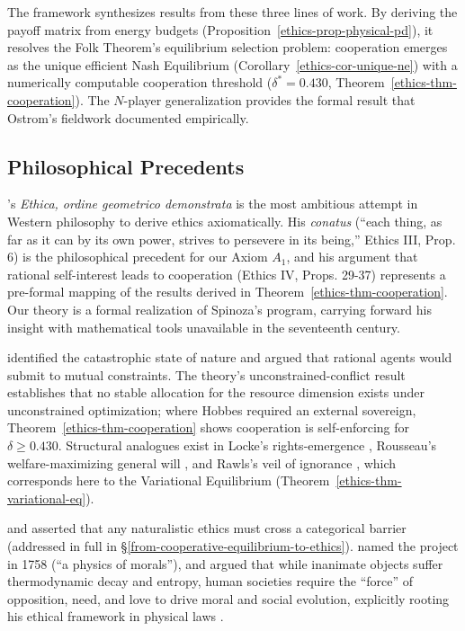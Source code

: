 \documentclass[11pt]{article}
\theoremstyle{plain}
\theoremstyle{definition}
\theoremstyle{remark}
\let\origsubsection\subsection
\renewcommand{\subsection}{\needspace{7\baselineskip}\origsubsection}
\begin{document}
The framework synthesizes results from these three lines of work. By
deriving the payoff matrix from energy budgets
(Proposition~\ref{ethics-prop-physical-pd}), it resolves the Folk
Theorem's equilibrium selection problem: cooperation emerges as the
unique efficient Nash Equilibrium (Corollary~\ref{ethics-cor-unique-ne})
with a numerically computable cooperation threshold
(\(\delta^* = 0.430\), Theorem~\ref{ethics-thm-cooperation}). The
\(N\)-player generalization \citep{TC-V} provides the formal result that
Ostrom's fieldwork documented empirically.

\subsection{Philosophical Precedents}\label{philosophical-precedents}

\citet{Spinoza1677}'s \emph{Ethica, ordine geometrico demonstrata} is
the most ambitious attempt in Western philosophy to derive ethics
axiomatically. His \emph{conatus} (``each thing, as far as it can by its
own power, strives to persevere in its being,'' Ethics III, Prop. 6) is
the philosophical precedent for our Axiom \(A_1\), and his argument that
rational self-interest leads to cooperation (Ethics IV, Props. 29-37)
represents a pre-formal mapping of the results derived in
Theorem~\ref{ethics-thm-cooperation}. Our theory is a formal realization
of Spinoza's program, carrying forward his insight with mathematical
tools unavailable in the seventeenth century.

\citet{Hobbes1651} identified the catastrophic state of nature and
argued that rational agents would submit to mutual constraints. The
theory's unconstrained-conflict result \citep{TC-I} establishes that no
stable allocation for the resource dimension exists under unconstrained
optimization; where Hobbes required an external sovereign,
Theorem~\ref{ethics-thm-cooperation} shows cooperation is self-enforcing
for \(\delta \geq 0.430\). Structural analogues exist in Locke's
rights-emergence \citep{Locke1689}, Rousseau's welfare-maximizing
general will \citep{Rousseau1762}, and Rawls's veil of ignorance
\citep{Rawls1971}, which corresponds here to the Variational Equilibrium
(Theorem~\ref{ethics-thm-variational-eq}).

\citet{Hume1739} and \citet{Moore1903} asserted that any naturalistic
ethics must cross a categorical barrier (addressed in full in
§\ref{from-cooperative-equilibrium-to-ethics}). \citet{Helvetius1758}
named the project in 1758 (``a physics of morals''), and
\citet{Bazargan1956} argued that while inanimate objects suffer
thermodynamic decay and entropy, human societies require the ``force''
of opposition, need, and love to drive moral and social evolution,
explicitly rooting his ethical framework in physical laws
\citep{Kurzman1998}.
\end{document}

